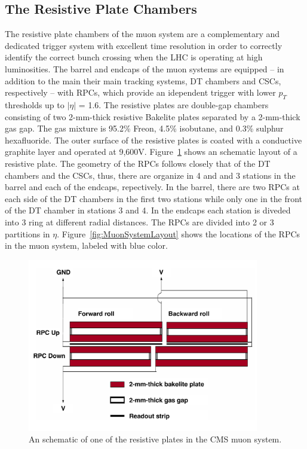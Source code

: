 \subsection{The Resistive Plate Chambers}
The resistive plate chambers of the muon system are a complementary
and dedicated trigger system with excellent time resolution in order
to correctly identify the correct bunch crossing when the LHC is
operating at high luminosities. The barrel and endcaps of the muon
systems are equipped -- in addition to the main their main tracking
systems, DT chambers and CSCs, respectively -- with RPCs, which
provide an idependent trigger with lower $p_{T}$ thresholds up to
$|\eta|$ = 1.6. The resistive plates are double-gap chambers consisting of two
2-mm-thick resistive Bakelite plates separated by a 2-mm-thick gas
gap. The gas mixture is 95.2\% Freon, 4.5\% isobutane, and 0.3\%
sulphur hexafluoride. The outer surface of the resistive plates is
coated with a conductive graphite layer and operated at
9,600\unit{V}. Figure~\ref{fig:rpc} shows an schematic layout of a
resistive plate.
The geometry of the RPCs follows closely that of the DT chambers and
the CSCs, thus, there are organize in 4 and and 3 stations in the
barrel and each of the endcaps, repectively. In the barrel, there are two RPCs at
each side of the DT chambers in the first two stations while only one
in the front of the DT chamber in stations 3 and 4. In the endcaps
each station is diveded into 3 ring at different radial distances. The
RPCs are divided into 2 or 3 partitions in $\eta$. Figure~\ref{fig:MuonSystemLayout} shows
the locations of the RPCs in the muon system, labeled with blue color.
\begin{figure}
 \centering
\includegraphics[width=0.9\textwidth]{CMS_DetectorFigures/RPC.pdf}
\caption{An schematic of one of the resistive plates in the CMS muon system.\label{fig:rpc}}
\end{figure}

